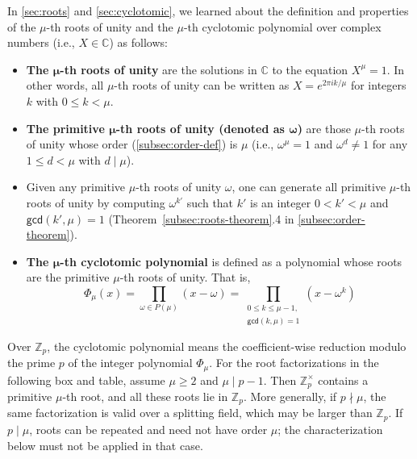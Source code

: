 In \autoref{sec:roots} and \autoref{sec:cyclotomic}, we learned about the definition and properties of the $\mu$-th roots of unity and the $\mu$-th cyclotomic polynomial over complex numbers (i.e., $X \in \mathbb{C}$) as follows: 

\begin{itemize}
\item \textbf{The $\bm \mu$-th roots of unity} are the solutions in $\mathbb{C}$ to the equation $X^\mu = 1$. In other words, all $\mu$-th roots of unity can be written as $X = e^{2 \pi i k / \mu}$ for integers $k$ with $0 \le k < \mu$.
\item \textbf{The primitive $\bm \mu$-th roots of unity (denoted as $\bm \omega$)} are those $\mu$-th roots of unity whose order (\autoref{subsec:order-def}) is $\mu$ (i.e., $\omega^{\mu} = 1$ and $\omega^d \neq 1$ for any $1 \le d < \mu$ with $d \mid \mu$).
\item Given any primitive $\mu$-th roots of unity $\omega$, one can generate all primitive $\mu$-th roots of unity by computing $\omega^{k'}$ such that $k'$ is an integer $0 < k' < \mu$ and $\textsf{gcd}(k', \mu) = 1$ (Theorem~\ref*{subsec:roots-theorem}.4 in \autoref{subsec:order-theorem}). 
\item \textbf{The $\bm \mu$-th cyclotomic polynomial} is defined as a polynomial whose roots are the primitive $\mu$-th roots of unity. That is, \[ \Phi_{\mu}(x) = \prod_{\omega \in P({\mu})} (x - \omega) = \prod_{\substack{0 \leq k \leq {\mu}-1,\\ \textsf{gcd}(k, {\mu}) = 1}} (x - \omega^k) \]
\end{itemize}

Over $\mathbb{Z}_p$, the cyclotomic polynomial means the coefficient-wise reduction modulo the prime $p$ of the integer polynomial $\Phi_\mu$. For the root factorizations in the following box and table, assume $\mu\ge2$ and $\mu\mid p-1$. Then $\mathbb{Z}_p^\times$ contains a primitive $\mu$-th root, and all these roots lie in $\mathbb{Z}_p$. More generally, if $p\nmid\mu$, the same factorization is valid over a splitting field, which may be larger than $\mathbb{Z}_p$. If $p\mid\mu$, roots can be repeated and need not have order $\mu$; the characterization below must not be applied in that case.

